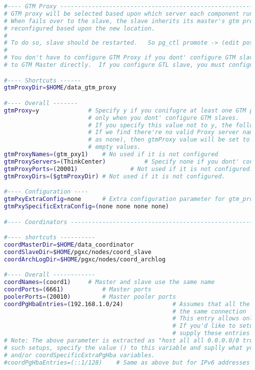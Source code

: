 \begin{lstlisting}[language=bash,caption={Konfigurationsdatei pgxc-ctl}]
#---- GTM Proxy -------------------------------------------------------------------------------------------------------
# GTM proxy will be selected based upon which server each component runs on.
# When fails over to the slave, the slave inherits its master's gtm proxy.  It should be
# reconfigured based upon the new location.
#
# To do so, slave should be restarted.   So pg_ctl promote -> (edit postgresql.conf and recovery.conf) -> pg_ctl restart
#
# You don't have to configure GTM Proxy if you dont' configure GTM slave or you are happy if every component connects
# to GTM Master directly.  If you configure GTL slave, you must configure GTM proxy too.

#---- Shortcuts ------
gtmProxyDir=$HOME/data_gtm_proxy

#---- Overall -------
gtmProxy=y				# Specify y if you conifugre at least one GTM proxy.   You may not configure gtm proxies
						# only when you dont' configure GTM slaves.
						# If you specify this value not to y, the following parameters will be set to default empty values.
						# If we find there're no valid Proxy server names (means, every servers are specified
						# as none), then gtmProxy value will be set to "n" and all the entries will be set to
						# empty values.
gtmProxyNames=(gtm_pxy1)	# No used if it is not configured
gtmProxyServers=(ThinkCenter)			# Specify none if you dont' configure it.
gtmProxyPorts=(20001)				# Not used if it is not configured.
gtmProxyDirs=($gtmProxyDir)	# Not used if it is not configured.

#---- Configuration ----
gtmPxyExtraConfig=none		# Extra configuration parameter for gtm_proxy.  Coordinator section has an example.
gtmPxySpecificExtraConfig=(none none none none)

#---- Coordinators ----------------------------------------------------------------------------------------------------

#---- shortcuts ----------
coordMasterDir=$HOME/data_coordinator
coordSlaveDir=$HOME/pgxc/nodes/coord_slave
coordArchLogDir=$HOME/pgxc/nodes/coord_archlog

#---- Overall ------------
coordNames=(coord1)		# Master and slave use the same name
coordPorts=(6661)			# Master ports
poolerPorts=(20010)			# Master pooler ports
coordPgHbaEntries=(192.168.1.0/24)				# Assumes that all the coordinator (master/slave) accepts
												# the same connection
												# This entry allows only $pgxcOwner to connect.
												# If you'd like to setup another connection, you should
												# supply these entries through files specified below.
# Note: The above parameter is extracted as "host all all 0.0.0.0/0 trust".   If you don't want
# such setups, specify the value () to this variable and suplly what you want using coordExtraPgHba
# and/or coordSpecificExtraPgHba variables.
#coordPgHbaEntries=(::1/128)	# Same as above but for IPv6 addresses


\end{lstlisting}
